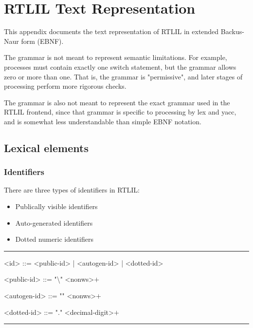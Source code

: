 \chapter{RTLIL Text Representation}
\label{chapter:textrtlil}

\newlength{\myl}

\newenvironment{indentgrammar}[1]
    {\vspace{0.5cm}\hrule
    \setlength{\myl}{\widthof{#1}+2em}
    \grammarindent\the\myl
    \begin{grammar}}
    {\end{grammar}
    \hrule}

This appendix documents the text representation of RTLIL in extended Backus-Naur form (EBNF).

The grammar is not meant to represent semantic limitations. For example, processes must contain exactly one switch statement, but the grammar allows zero or more than one. That is, the grammar is "permissive", and later stages of processing perform more rigorous checks.

The grammar is also not meant to represent the exact grammar used in the RTLIL frontend, since that grammar is specific to processing by lex and yacc, and is somewhat less understandable than simple EBNF notation.

\section{Lexical elements}

\subsection{Identifiers}

There are three types of identifiers in RTLIL:

\begin{itemize}
    \item Publically visible identifiers
    \item Auto-generated identifiers
    \item Dotted numeric identifiers
\end{itemize}

\begin{indentgrammar}{<autogen-id>}
<id> ::= <public-id> | <autogen-id> | <dotted-id>

<public-id> ::= "\textbackslash" <nonws>$+$

<autogen-id> ::= "\textdollar" <nonws>$+$

<dotted-id> ::= "." <decimal-digit>$+$
\end{indentgrammar}

